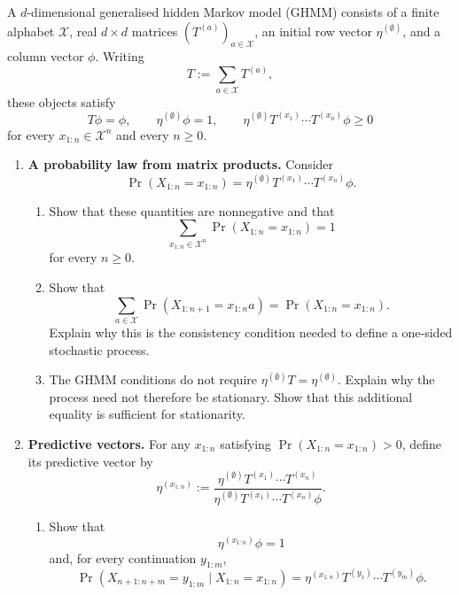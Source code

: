 \begin{exercise}
\label{ex:p3-4}
  A $d$-dimensional generalised hidden Markov model (GHMM) consists of a
  finite alphabet $\mathcal X$, real $d\times d$ matrices
  $(T^{(a)})_{a\in\mathcal X}$, an initial row vector
  $\eta^{(\emptyset)}$, and a column vector $\phi$. Writing
  \[
    T:=\sum_{a\in\mathcal X}T^{(a)},
  \]
  these objects satisfy
  \[
    T\phi=\phi,\qquad
    \eta^{(\emptyset)}\phi=1,\qquad
    \eta^{(\emptyset)}T^{(x_1)}\cdots T^{(x_n)}\phi\geq0
  \]
  for every $x_{1:n}\in\mathcal X^n$ and every $n\geq0$.

  \begin{enumerate}
    \item \textbf{A probability law from matrix products.}
      Consider
      \[
        \Pr(X_{1:n}=x_{1:n})
          =\eta^{(\emptyset)}
            T^{(x_1)}\cdots T^{(x_n)}\phi.
      \]
      \begin{enumerate}
        \item Show that these quantities are nonnegative and that
          \[
            \sum_{x_{1:n}\in\mathcal X^n}
              \Pr(X_{1:n}=x_{1:n})=1
          \]
          for every $n\geq0$.

        \item Show that
          \[
            \sum_{a\in\mathcal X}
              \Pr(X_{1:n+1}=x_{1:n}a)
              =\Pr(X_{1:n}=x_{1:n}).
          \]
          Explain why this is the consistency condition needed to define a
          one-sided stochastic process.

        \item The GHMM conditions do not require
          $\eta^{(\emptyset)}T=\eta^{(\emptyset)}$. Explain why the process
          need not therefore be stationary. Show that this additional
          equality is sufficient for stationarity.
      \end{enumerate}

    \item \textbf{Predictive vectors.}
      For any $x_{1:n}$ satisfying
      $\Pr(X_{1:n}=x_{1:n})>0$, define its predictive vector by
      \[
        \eta^{(x_{1:n})}
          :=\frac{\eta^{(\emptyset)}
              T^{(x_1)}\cdots T^{(x_n)}}
            {\eta^{(\emptyset)}
              T^{(x_1)}\cdots T^{(x_n)}\phi}.
      \]
      \begin{enumerate}
        \item Show that
          \[
            \eta^{(x_{1:n})}\phi=1
          \]
          and, for every continuation $y_{1:m}$,
          \[
            \Pr(X_{n+1:n+m}=y_{1:m}\mid X_{1:n}=x_{1:n})
              =\eta^{(x_{1:n})}
                T^{(y_1)}\cdots T^{(y_m)}\phi.
          \]


\end{enumerate}
\end{enumerate}
\end{exercise}
